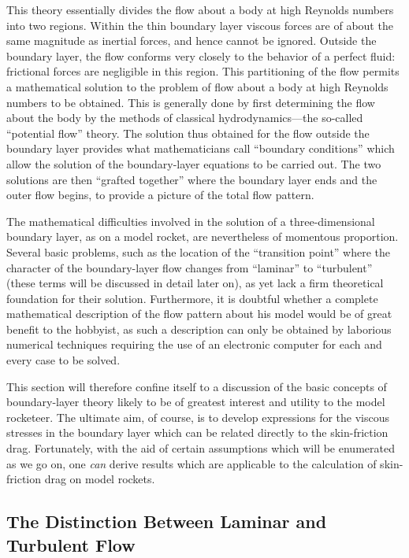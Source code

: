 This theory essentially divides the flow about a body at high Reynolds numbers
into two regions. Within the thin boundary layer viscous forces are of about
the same magnitude as inertial forces, and hence cannot be ignored. Outside
the boundary layer, the flow conforms very closely to the behavior of a
perfect fluid: frictional forces are negligible in this region. This
partitioning of the flow permits a mathematical solution to the problem of
flow about a body at high Reynolds numbers to be obtained. This is generally
done by first determining the flow about the body by the methods of classical
hydrodynamics---the so-called ``potential flow'' theory. The solution thus
obtained for the flow outside the boundary layer provides what mathematicians
call ``boundary conditions'' which allow the solution of the boundary-layer
equations to be carried out. The two solutions are then ``grafted together''
where the boundary layer ends and the outer flow begins, to provide a picture
of the total flow pattern.

The mathematical difficulties involved in the solution of a three-dimensional
boundary layer, as on a model rocket, are nevertheless of momentous
proportion. Several basic problems, such as the location of the ``transition
point'' where the character of the boundary-layer flow changes from
``laminar'' to ``turbulent'' (these terms will be discussed in detail later
on), as yet lack a firm theoretical foundation for their solution.
Furthermore, it is doubtful whether a complete mathematical description of the
flow pattern about his model would be of great benefit to the hobbyist, as
such a description can only be obtained by laborious numerical techniques
requiring the use of an electronic computer for each and every case to be
solved.

This section will therefore confine itself to a discussion of the basic
concepts of boundary-layer theory likely to be of greatest interest and
utility to the model rocketeer. The ultimate aim, of course, is to develop
expressions for the viscous stresses in the boundary layer which can be
related directly to the skin-friction drag. Fortunately, with the aid of
certain assumptions which will be enumerated as we go on, one \emph{can}
derive results which are applicable to the calculation of skin-friction drag
on model rockets.

\subsection{The Distinction Between Laminar and Turbulent Flow}\label{ch3:sec:3.2}


